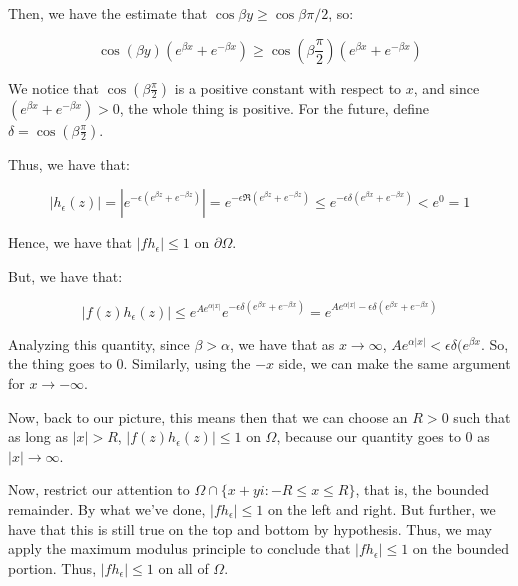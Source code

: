 \documentclass[10pt]{article}
\begin{document}
Then, we have the estimate that $\cos \beta y \geq \cos \beta \pi/2$, so:

$$ \cos(\beta y) (e^{\beta x} + e^{-\beta x}) \geq \cos(\beta \frac{\pi}{2}) (e^{\beta x} + e^{-\beta x})$$

We notice that $\cos(\beta \frac{\pi}{2})$ is a positive constant with respect to $x$, and since $(e^{\beta x} + e^{-\beta x}) > 0$, the whole thing is positive. For the future, define $\delta = \cos(\beta \frac{\pi}{2})$.

Thus, we have that:
 
$$|h_\epsilon(z)| = \left| e^{-\epsilon(e^{\beta z} + e^{-\beta z} )} \right| = e^{-\epsilon \Re(e^{\beta z} + e^{-\beta z})} \leq e^{-\epsilon \delta(e^{\beta x} + e^{-\beta x})} < e^{0} = 1$$

Hence, we have that $| f h_\epsilon | \leq 1$ on $\partial \Omega$. 

But, we have that:

$$ |f(z) h_\epsilon(z)| \leq e^{Ae^{\alpha |x|}} e^{-\epsilon \delta(e^{\beta x} + e^{-\beta x})} = e^{Ae^{\alpha |x|}-\epsilon \delta(e^{\beta x} + e^{-\beta x})} $$





Analyzing this quantity, since $\beta > \alpha$, we have that as $x \to \infty$, $Ae^{\alpha |x|} < \epsilon \delta(e^{\beta x}$. So, the thing goes to 0. Similarly, using the $-x$ side, we can make the same argument for $x \to -\infty$.

Now,  back to our picture, this means then that we can choose an $R > 0$ such that as long as $|x| > R$, $|f(z) h_\epsilon(z)|  \leq 1$ on $\Omega$, because our quantity goes to 0 as $ |x| \to \infty$. 

Now, restrict our attention to $\Omega \cap \{ x + yi : -R \leq x \leq R \}$, that is, the bounded remainder. By what we’ve done, $|f h_\epsilon| \leq 1$ on the left and right. But further, we have that this is still true on the top and bottom by hypothesis. Thus, we may apply the maximum modulus principle to conclude that $|f h_\epsilon| \leq 1$ on the bounded portion. Thus, $|f h_\epsilon| \leq 1$ on all of $\Omega$. 
\end{document}
